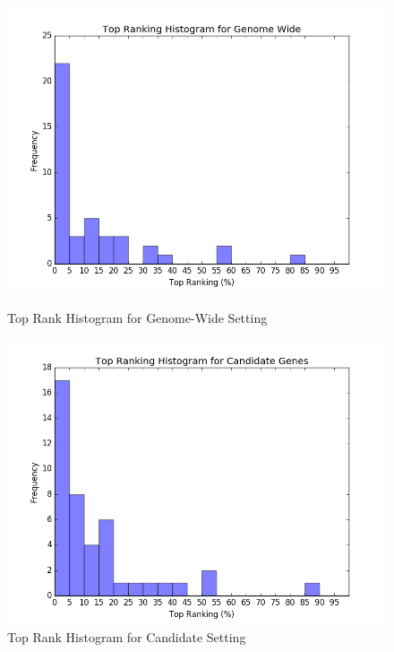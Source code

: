 \begin{figure}
\centering
\begin{minipage}{.5\textwidth}
  \centering
  \includegraphics[width=1\linewidth]{img/histogram_genomewide.png}
  \caption{Top Rank Histogram for Genome-Wide Setting}
  \label{fig:histogram-candidate}
\end{minipage}%
\begin{minipage}{.5\textwidth}
  \centering
  \includegraphics[width=1\linewidth]{img/histogram_candidate.png}
  \caption{Top Rank Histogram for Candidate Setting}
  \label{fig:histogram-candidate}
\end{minipage}
\end{figure}



